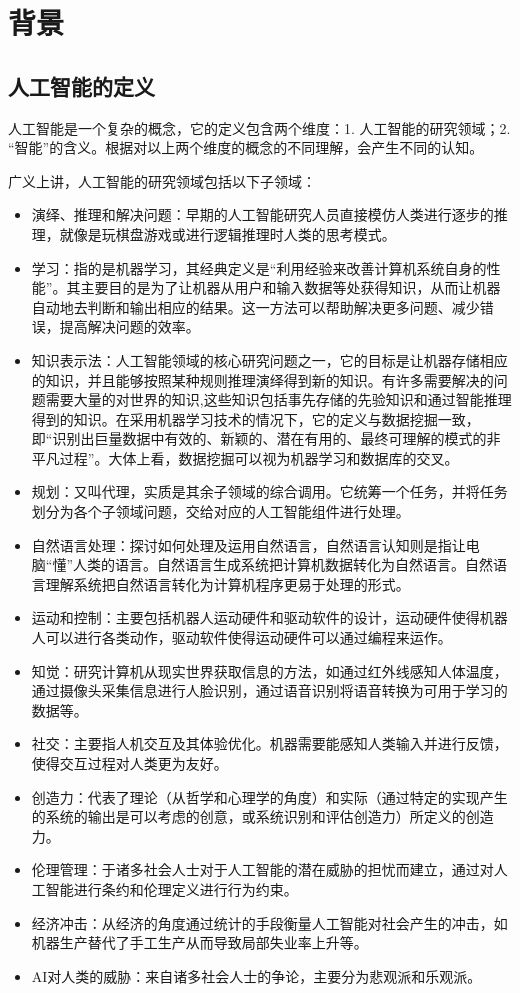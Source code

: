 \documentclass[fontset=fandol,UTF8]{article}
\begin{document}
\section{背景}
\subsection{人工智能的定义}
人工智能是一个复杂的概念，它的定义包含两个维度：1. 人工智能的研究领域；2. “智能”的含义。根据对以上两个维度的概念的不同理解，会产生不同的认知。

广义上讲，人工智能的研究领域包括以下子领域\cite{wikiai}：
\begin{itemize}
\item 演绎、推理和解决问题：早期的人工智能研究人员直接模仿人类进行逐步的推理，就像是玩棋盘游戏或进行逻辑推理时人类的思考模式\cite{r2016}。
\item 学习：指的是机器学习，其经典定义是“利用经验来改善计算机系统自身的性能”\cite{ml}。其主要目的是为了让机器从用户和输入数据等处获得知识，从而让机器自动地去判断和输出相应的结果。这一方法可以帮助解决更多问题、减少错误，提高解决问题的效率。
\item 知识表示法：人工智能领域的核心研究问题之一，它的目标是让机器存储相应的知识，并且能够按照某种规则推理演绎得到新的知识。有许多需要解决的问题需要大量的对世界的知识,这些知识包括事先存储的先验知识和通过智能推理得到的知识。在采用机器学习技术的情况下，它的定义与数据挖掘一致，即“识别出巨量数据中有效的、新颖的、潜在有用的、最终可理解的模式的非平凡过程”\cite{dm}。大体上看，数据挖掘可以视为机器学习和数据库的交叉。
\item 规划：又叫代理，实质是其余子领域的综合调用。它统筹一个任务，并将任务划分为各个子领域问题，交给对应的人工智能组件进行处理。
\item 自然语言处理：探讨如何处理及运用自然语言，自然语言认知则是指让电脑“懂”人类的语言。自然语言生成系统把计算机数据转化为自然语言。自然语言理解系统把自然语言转化为计算机程序更易于处理的形式。
\item 运动和控制：主要包括机器人运动硬件和驱动软件的设计，运动硬件使得机器人可以进行各类动作，驱动软件使得运动硬件可以通过编程来运作。
\item 知觉：研究计算机从现实世界获取信息的方法，如通过红外线感知人体温度，通过摄像头采集信息进行人脸识别，通过语音识别将语音转换为可用于学习的数据等。
\item 社交：主要指人机交互及其体验优化。机器需要能感知人类输入并进行反馈，使得交互过程对人类更为友好。
\item 创造力：代表了理论（从哲学和心理学的角度）和实际（通过特定的实现产生的系统的输出是可以考虑的创意，或系统识别和评估创造力）所定义的创造力。
\item 伦理管理：于诸多社会人士对于人工智能的潜在威胁的担忧而建立，通过对人工智能进行条约和伦理定义进行行为约束。
\item 经济冲击：从经济的角度通过统计的手段衡量人工智能对社会产生的冲击，如机器生产替代了手工生产从而导致局部失业率上升等。
\item AI对人类的威胁：来自诸多社会人士的争论，主要分为悲观派和乐观派。
\end{itemize}
\end{document}
